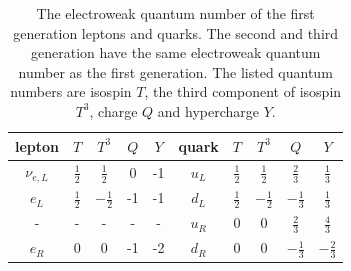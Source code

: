 \begin{table}[ht]
    \centering
    \setlength{\tabcolsep}{1 em}
    \renewcommand{\arraystretch}{1.5}
    \caption{The electroweak quantum number of the first generation leptons and quarks. The second and third generation have the same electroweak quantum number as the first generation. The listed quantum numbers are isospin $T$, the third component of isospin $T^3$, charge $Q$ and hypercharge $Y$. }
    \begin{tabular}{ccccc|ccccc}
    \hline
    lepton      & $T$           & $T^3$          & $Q$ & $Y$ & quark  & $T$           & $T^3$          & $Q$            & $Y$            \\
    \hline
    $\nu_{e,L}$ & $\frac{1}{2}$ & $\frac{1}{2}$  & 0   & -1  & $u_L$  & $\frac{1}{2}$ & $\frac{1}{2}$  & $\frac{2}{3}$  & $\frac{1}{3}$  \\
    $e_L$       & $\frac{1}{2}$ & $-\frac{1}{2}$ & -1  & -1  & $d_L$  & $\frac{1}{2}$ & $-\frac{1}{2}$ & $-\frac{1}{3}$ & $\frac{1}{3}$  \\
    \hline
    -           & -             & -              & -   & -   & $u_R$  & 0             & 0              & $\frac{2}{3}$  & $\frac{4}{3}$  \\
    $e_R$       & 0             & 0              & -1  & -2  & $d_R$  & 0             & 0              & $-\frac{1}{3}$ & $-\frac{2}{3}$ \\
    \hline
    \end{tabular}
    \label{tab:physics:smParticles:ewQuantumNumber}
\end{table}


